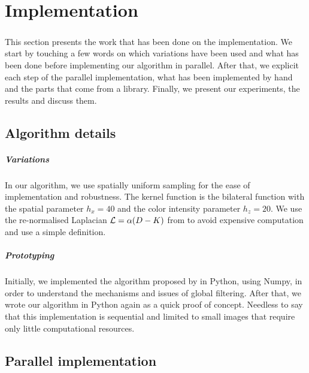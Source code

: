 \chapter{Implementation}

\paragraph{}
This section presents the work that has been done on the implementation.
We start by touching a few words on which variations have been used and what has been done before implementing our algorithm in parallel.
After that, we explicit each step of the parallel implementation, what has been implemented by hand and the parts that come from a library.
Finally, we present our experiments, the results and discuss them.

\section{Algorithm details}

\paragraph{Variations}
In our algorithm, we use spatially uniform sampling for the ease of implementation and robustness.
The kernel function is the bilateral function with the spatial parameter \(h_x = 40\) and the color intensity parameter \(h_z = 20\).
We use the re-normalised Laplacian \(\operatorname{\mathcal{L}} = \alpha (D-K)\) from \cite{milanfar_new_2016} to avoid expensive computation and use a simple definition.

\paragraph{Prototyping}
Initially, we implemented the algorithm proposed by \cite{glide_2014} in Python, using Numpy, in order to understand the mechanisms and issues of global filtering.
After that, we wrote our algorithm in Python again as a quick proof of concept.
Needless to say that this implementation is sequential and limited to small images that require only little computational resources.

\section{Parallel implementation}

